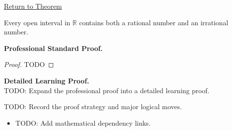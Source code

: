 \newpage
{}
\label{prf:every-open-interval-contains-rational-and-irrational}

\begin{remark*}[Return]
\hyperref[cor:every-open-interval-contains-rational-and-irrational]{Return to Theorem}
\end{remark*}

\begin{theorem*}
Every open interval in $\mathbb{R}$ contains both a rational number and an irrational number.
\end{theorem*}

\textbf{Professional Standard Proof.}~\\
\begin{proof}
TODO
\end{proof}

\textbf{Detailed Learning Proof.}~\\
TODO: Expand the professional proof into a detailed learning proof.

\begin{remark*}
TODO: Record the proof strategy and major logical moves.
\end{remark*}

\begin{dependencies}
\begin{itemize}
  \item TODO: Add mathematical dependency links.
\end{itemize}
\end{dependencies}
